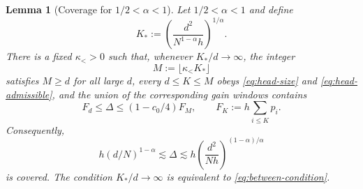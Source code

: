 \documentclass[11pt]{article}
\newtheorem{lemma}[lemma]{Lemma}
\theoremstyle{definition}
\begin{document}
\begin{lemma}[Coverage for $1/2<\alpha<1$]
\label{lem:between-coverage}
Let $1/2<\alpha<1$ and define
\begin{equation}
 K_*:=\left(\frac{d^2}{N^{1-\alpha}h}\right)^{1/\alpha}.
 \label{eq:Kstar-between}
\end{equation}
There is a fixed $\kappa_< >0$ such that, whenever
$K_*/d\to\infty$, the integer
\[
 M:=\lfloor\kappa_< K_*\rfloor
\]
satisfies $M\geq d$ for all large $d$, every $d\leq K\leq M$ obeys
\eqref{eq:head-size} and \eqref{eq:head-admissible}, and the union of
the corresponding gain windows contains
\begin{equation}
 F_d\leq\Delta\leq(1-c_0/4)F_M,
 \qquad
 F_K:=h\sum_{i\leq K}p_i.
 \label{eq:exact-between-covered}
\end{equation}
Consequently,
\begin{equation}
 h(d/N)^{1-\alpha}\lesssim\Delta\lesssim
 h\left(\frac{d^2}{Nh}\right)^{(1-\alpha)/\alpha}
 \label{eq:between-covered-orders}
\end{equation}
is covered.  The condition $K_*/d\to\infty$ is equivalent to
\eqref{eq:between-condition}.
\end{lemma}
\end{document}
